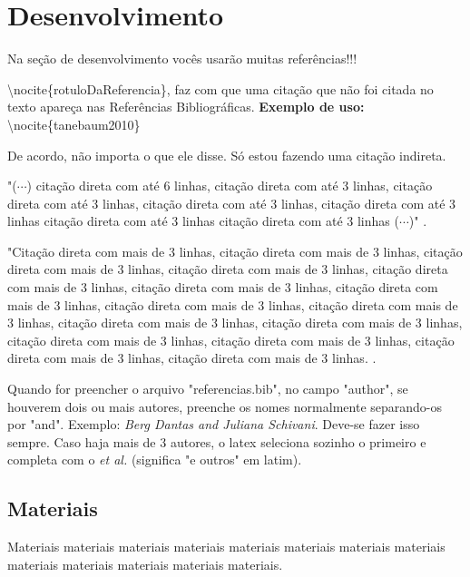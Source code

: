 \documentclass[article,12pt,oneside,a4paper,english,brazil,sumario=tradicional]{abntex2}
\begin{document}
\section{Desenvolvimento}
Na se\c c\~ao de desenvolvimento voc\^es usar\~ao muitas refer\^encias!!!

\textbackslash nocite\{rotuloDaReferencia\}, faz com que uma cita\c c\~ao que n\~ao foi citada no texto apare\c ca nas Refer\^encias Bibliogr\'aficas. \textbf{Exemplo de uso:} \textbackslash nocite\{tanebaum2010\} 

De acordo, n\~ao importa o que ele disse. S\'o estou fazendo uma cita\c c\~ao indireta. 

"($\cdots$) cita\c c\~ao direta com at\'e 6 linhas, cita\c c\~ao direta com at\'e 3 linhas, cita\c c\~ao direta com at\'e 3 linhas, cita\c c\~ao direta com at\'e 3 linhas, cita\c c\~ao direta com at\'e 3 linhas cita\c c\~ao direta com at\'e 3 linhas cita\c c\~ao direta com at\'e 3 linhas ($\cdots$)" \cite[p.~34]{tanebaum2010}. 
 
\vspace{24pt} %
\begin{citacao}
"Cita\c c\~ao direta com mais de 3 linhas, cita\c c\~ao direta com mais de 3 linhas, cita\c c\~ao direta com mais de 3 linhas, cita\c c\~ao direta com mais de 3 linhas, cita\c c\~ao direta com mais de 3 linhas, cita\c c\~ao direta com mais de 3 linhas, cita\c c\~ao direta com mais de 3 linhas, cita\c c\~ao direta com mais de 3 linhas, cita\c c\~ao direta com mais de 3 linhas, cita\c c\~ao direta com mais de 3 linhas, cita\c c\~ao direta com mais de 3 linhas, cita\c c\~ao direta com mais de 3 linhas, cita\c c\~ao direta com mais de 3 linhas, cita\c c\~ao direta com mais de 3 linhas, cita\c c\~ao direta com mais de 3 linhas. \cite[p.~34]{tanebaum2010}. 
\end{citacao}
\vspace{24pt} %

Quando for preencher o arquivo "referencias.bib", no campo "author", se houverem dois ou mais autores, preenche os nomes normalmente separando-os por "and". Exemplo: \textit{Berg Dantas and Juliana Schivani}. Deve-se fazer isso sempre. Caso haja mais de 3 autores, o latex seleciona sozinho o primeiro e completa com o \textit{et al.} (significa "e outros" em latim). 

 
\subsection{Materiais}
Materiais materiais materiais materiais materiais materiais materiais materiais materiais materiais materiais materiais materiais.
\end{document}

